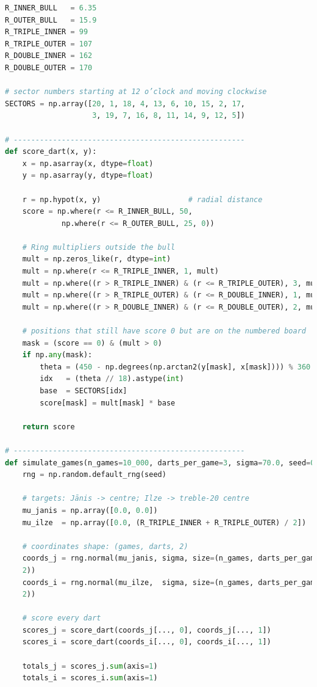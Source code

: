 \documentclass[12pt]{article}
\begin{document}
\begin{lstlisting}[language=Python]
R_INNER_BULL   = 6.35
R_OUTER_BULL   = 15.9
R_TRIPLE_INNER = 99
R_TRIPLE_OUTER = 107
R_DOUBLE_INNER = 162
R_DOUBLE_OUTER = 170

# sector numbers starting at 12 o’clock and moving clockwise
SECTORS = np.array([20, 1, 18, 4, 13, 6, 10, 15, 2, 17,
                    3, 19, 7, 16, 8, 11, 14, 9, 12, 5])

# -----------------------------------------------------
def score_dart(x, y):
    x = np.asarray(x, dtype=float)
    y = np.asarray(y, dtype=float)

    r = np.hypot(x, y)                    # radial distance
    score = np.where(r <= R_INNER_BULL, 50,
             np.where(r <= R_OUTER_BULL, 25, 0))

    # Ring multipliers outside the bull
    mult = np.zeros_like(r, dtype=int)
    mult = np.where(r <= R_TRIPLE_INNER, 1, mult)
    mult = np.where((r > R_TRIPLE_INNER) & (r <= R_TRIPLE_OUTER), 3, mult)
    mult = np.where((r > R_TRIPLE_OUTER) & (r <= R_DOUBLE_INNER), 1, mult)
    mult = np.where((r > R_DOUBLE_INNER) & (r <= R_DOUBLE_OUTER), 2, mult)

    # positions that still have score 0 but are on the numbered board
    mask = (score == 0) & (mult > 0)
    if np.any(mask):
        theta = (450 - np.degrees(np.arctan2(y[mask], x[mask]))) % 360
        idx   = (theta // 18).astype(int)
        base  = SECTORS[idx]
        score[mask] = mult[mask] * base

    return score

# -----------------------------------------------------
def simulate_games(n_games=10_000, darts_per_game=3, sigma=70.0, seed=0):
    rng = np.random.default_rng(seed)

    # targets: Jānis -> centre; Ilze -> treble-20 centre
    mu_janis = np.array([0.0, 0.0])
    mu_ilze  = np.array([0.0, (R_TRIPLE_INNER + R_TRIPLE_OUTER) / 2])

    # coordinates shape: (games, darts, 2)
    coords_j = rng.normal(mu_janis, sigma, size=(n_games, darts_per_game,
    2))
    coords_i = rng.normal(mu_ilze,  sigma, size=(n_games, darts_per_game,
    2))

    # score every dart
    scores_j = score_dart(coords_j[..., 0], coords_j[..., 1])
    scores_i = score_dart(coords_i[..., 0], coords_i[..., 1])

    totals_j = scores_j.sum(axis=1)
    totals_i = scores_i.sum(axis=1)


\end{lstlisting}
\end{document}
